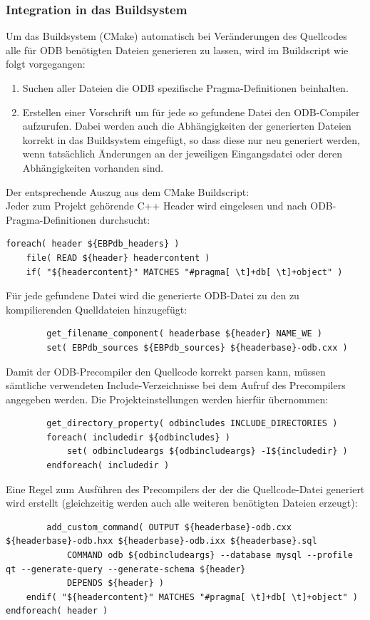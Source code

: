 \subsubsection{Integration in das Buildsystem}
Um das Buildsystem (CMake) automatisch bei Veränderungen des Quellcodes alle für ODB benötigten Dateien generieren zu lassen, wird im Buildscript wie folgt vorgegangen:
\begin{enumerate}
\item Suchen aller Dateien die ODB spezifische Pragma-Definitionen beinhalten.
\item Erstellen einer Vorschrift um für jede so gefundene Datei den ODB-Compiler aufzurufen.
	Dabei werden auch die Abhängigkeiten der generierten Dateien korrekt in das Buildsystem eingefügt, so dass diese nur neu generiert werden, wenn tatsächlich Änderungen an der jeweiligen Eingangsdatei oder deren Abhängigkeiten vorhanden sind.
\end{enumerate}
Der entsprechende Auszug aus dem CMake Buildscript:\\
\lstset{language=clean}
Jeder zum Projekt gehörende C++ Header wird eingelesen und nach ODB-Pragma-Definitionen durchsucht:
\begin{lstlisting}
foreach( header ${EBPdb_headers} )
	file( READ ${header} headercontent )
	if( "${headercontent}" MATCHES "#pragma[ \t]+db[ \t]+object" )
\end{lstlisting}
Für jede gefundene Datei wird die generierte ODB-Datei zu den zu kompilierenden Quelldateien hinzugefügt:
\begin{lstlisting}
		get_filename_component( headerbase ${header} NAME_WE )
		set( EBPdb_sources ${EBPdb_sources} ${headerbase}-odb.cxx )
\end{lstlisting}
Damit der ODB-Precompiler den Quellcode korrekt parsen kann, müssen sämtliche verwendeten Include-Verzeichnisse bei dem Aufruf des Precompilers angegeben werden. Die Projekteinstellungen werden hierfür übernommen:
\begin{lstlisting}
		get_directory_property( odbincludes INCLUDE_DIRECTORIES )
		foreach( includedir ${odbincludes} )
			set( odbincludeargs ${odbincludeargs} -I${includedir} )
		endforeach( includedir )
\end{lstlisting}
Eine Regel zum Ausführen des Precompilers der der die Quellcode-Datei generiert wird erstellt (gleichzeitig werden auch alle weiteren benötigten Dateien erzeugt):
\begin{lstlisting}
		add_custom_command( OUTPUT ${headerbase}-odb.cxx ${headerbase}-odb.hxx ${headerbase}-odb.ixx ${headerbase}.sql
			COMMAND odb ${odbincludeargs} --database mysql --profile qt --generate-query --generate-schema ${header}
			DEPENDS ${header} )
	endif( "${headercontent}" MATCHES "#pragma[ \t]+db[ \t]+object" )
endforeach( header )
\end{lstlisting}

